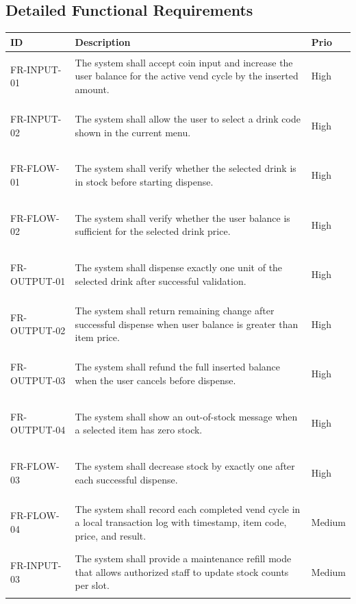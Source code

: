 \documentclass[a4paper,12pt]{article}
\begin{document}
    \subsection{Detailed Functional Requirements}
    \begin{longtable}{|p{2.1cm}|p{11.6cm}|p{1.3cm}|}
        \hline
        \textbf{ID} & \textbf{Description} & \textbf{Prio} \\
        \hline
        \hypertarget{req:FR-INPUT-01}{FR-INPUT-01} & The system shall accept coin input and increase the user balance for the active vend cycle by the inserted amount. & High \\
        \hline
        \hypertarget{req:FR-INPUT-02}{FR-INPUT-02} & The system shall allow the user to select a drink code shown in the current menu. & High \\
        \hline
        \hypertarget{req:FR-FLOW-01}{FR-FLOW-01} & The system shall verify whether the selected drink is in stock before starting dispense. & High \\
        \hline
        \hypertarget{req:FR-FLOW-02}{FR-FLOW-02} & The system shall verify whether the user balance is sufficient for the selected drink price. & High \\
        \hline
        \hypertarget{req:FR-OUTPUT-01}{FR-OUTPUT-01} & The system shall dispense exactly one unit of the selected drink after successful validation. & High \\
        \hline
        \hypertarget{req:FR-OUTPUT-02}{FR-OUTPUT-02} & The system shall return remaining change after successful dispense when user balance is greater than item price. & High \\
        \hline
        \hypertarget{req:FR-OUTPUT-03}{FR-OUTPUT-03} & The system shall refund the full inserted balance when the user cancels before dispense. & High \\
        \hline
        \hypertarget{req:FR-OUTPUT-04}{FR-OUTPUT-04} & The system shall show an out-of-stock message when a selected item has zero stock. & High \\
        \hline
        \hypertarget{req:FR-FLOW-03}{FR-FLOW-03} & The system shall decrease stock by exactly one after each successful dispense. & High \\
        \hline
        \hypertarget{req:FR-FLOW-04}{FR-FLOW-04} & The system shall record each completed vend cycle in a local transaction log with timestamp, item code, price, and result. & Medium \\
        \hline
        \hypertarget{req:FR-INPUT-03}{FR-INPUT-03} & The system shall provide a maintenance refill mode that allows authorized staff to update stock counts per slot. & Medium \\
        \hline
    \end{longtable}
\end{document}
